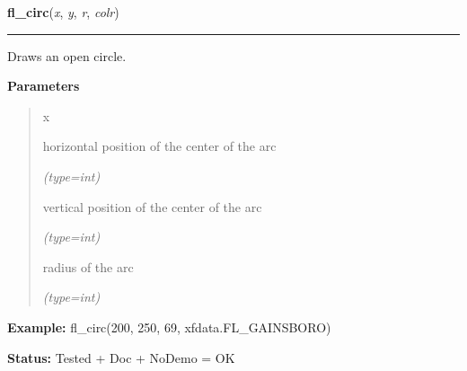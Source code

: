     \vspace{0.5ex}

\hspace{.8\funcindent}\begin{boxedminipage}{\funcwidth}

    \raggedright \textbf{fl\_circ}(\textit{x}, \textit{y}, \textit{r}, \textit{colr})

    \vspace{-1.5ex}

    \rule{\textwidth}{0.5\fboxrule}
\setlength{\parskip}{2ex}
    Draws an open circle.

\setlength{\parskip}{1ex}
      \textbf{Parameters}
      \vspace{-1ex}

      \begin{quote}
        \begin{Ventry}{x}

          \item[x]

          horizontal position of the center of the arc

            {\it (type=int)}

          \item[y]

          vertical position of the center of the arc

            {\it (type=int)}

          \item[r]

          radius of the arc

            {\it (type=int)}

        \end{Ventry}

      \end{quote}

\textbf{Example:} fl\_circ(200, 250, 69, xfdata.FL\_GAINSBORO)



\textbf{Status:} Tested + Doc + NoDemo = OK



    \end{boxedminipage}

    \label{xformslib:flxbasic:fl_pieslice}

    \vspace{0.5ex}

